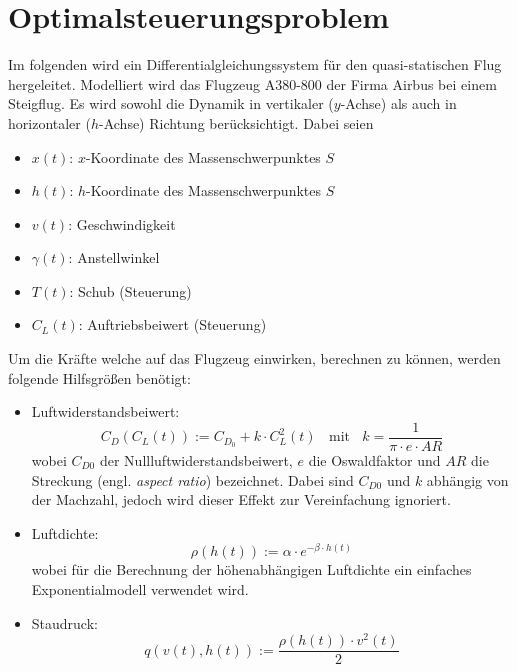 \chapter{Optimalsteuerungsproblem} \label{cha:optim}

Im folgenden wird ein Differentialgleichungssystem für den quasi-statischen Flug hergeleitet. Modelliert wird das Flugzeug A380-800 der Firma Airbus bei einem Steigflug. Es wird sowohl die Dynamik in vertikaler ($y$-Achse) als auch in horizontaler ($h$-Achse) Richtung berücksichtigt. Dabei seien
\begin{itemize}
    \item $x(t)$: $x$-Koordinate des Massenschwerpunktes $S$
    \item $h(t)$: $h$-Koordinate des Massenschwerpunktes $S$
    \item $v(t)$: Geschwindigkeit
    \item $\gamma(t)$: Anstellwinkel
    \item $T(t)$: Schub (Steuerung)
    \item $C_L(t)$: Auftriebsbeiwert (Steuerung)
\end{itemize}
Um die Kräfte welche auf das Flugzeug einwirken, berechnen zu können, werden folgende Hilfsgrößen benötigt:
\begin{itemize}
    \item Luftwiderstandsbeiwert: \[C_D(C_L(t)) := C_{D_0} + k \cdot C^2_L(t) \ \ \ \ \text{mit} \ \ \ \ k = \dfrac{1}{\pi \cdot e \cdot AR}\] wobei $C_{D0}$ der Nullluftwiderstandsbeiwert, $e$ die Oswaldfaktor und $AR$ die Streckung (engl. \textit{aspect ratio}) bezeichnet. Dabei sind $C_{D0}$ und $k$ abhängig von der Machzahl, jedoch wird dieser Effekt zur Vereinfachung ignoriert. 
    
    \item Luftdichte: \[\rho(h(t)) := \alpha \cdot e^{-\beta \cdot h(t)}\]  wobei für die Berechnung der höhenabhängigen Luftdichte ein einfaches Exponentialmodell verwendet wird.%

    \item Staudruck: \[q(v(t), h(t)) := \dfrac{\rho(h(t)) \cdot v^2(t)}{2} \]
\end{itemize}

